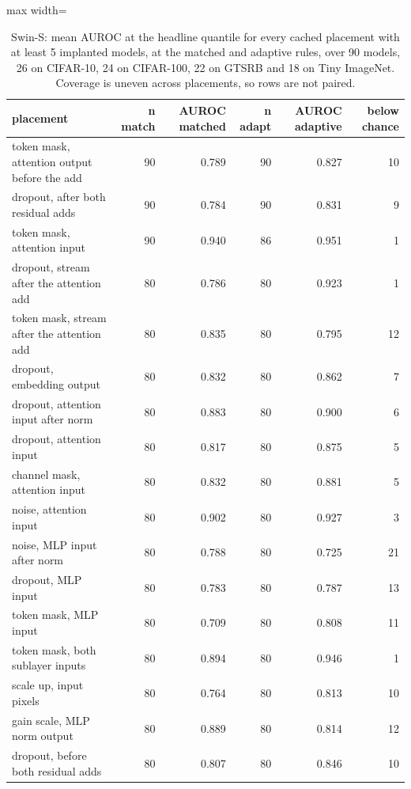 \begin{table}[htbp]
\centering
\small
\caption{Swin-S: mean AUROC at the headline quantile for every cached placement with at least 5 implanted models, at the matched and adaptive rules, over 90 models, 26 on CIFAR-10, 24 on CIFAR-100, 22 on GTSRB and 18 on Tiny ImageNet. Coverage is uneven across placements, so rows are not paired.}
\label{tab:swin-placements}
\begin{adjustbox}{max width=\linewidth}
\begin{tabular}{lrrrrr}
\toprule
placement & n match & AUROC matched & n adapt & AUROC adaptive & below chance \\
\midrule
token mask, attention output before the add & 90 & 0.789 & 90 & 0.827 & 10 \\
dropout, after both residual adds & 90 & 0.784 & 90 & 0.831 & 9 \\
token mask, attention input & 90 & 0.940 & 86 & 0.951 & 1 \\
dropout, stream after the attention add & 80 & 0.786 & 80 & 0.923 & 1 \\
token mask, stream after the attention add & 80 & 0.835 & 80 & 0.795 & 12 \\
dropout, embedding output & 80 & 0.832 & 80 & 0.862 & 7 \\
dropout, attention input after norm & 80 & 0.883 & 80 & 0.900 & 6 \\
dropout, attention input & 80 & 0.817 & 80 & 0.875 & 5 \\
channel mask, attention input & 80 & 0.832 & 80 & 0.881 & 5 \\
noise, attention input & 80 & 0.902 & 80 & 0.927 & 3 \\
noise, MLP input after norm & 80 & 0.788 & 80 & 0.725 & 21 \\
dropout, MLP input & 80 & 0.783 & 80 & 0.787 & 13 \\
token mask, MLP input & 80 & 0.709 & 80 & 0.808 & 11 \\
token mask, both sublayer inputs & 80 & 0.894 & 80 & 0.946 & 1 \\
scale up, input pixels & 80 & 0.764 & 80 & 0.813 & 10 \\
gain scale, MLP norm output & 80 & 0.889 & 80 & 0.814 & 12 \\
dropout, before both residual adds & 80 & 0.807 & 80 & 0.846 & 10 \\

\end{tabular}
\end{adjustbox}
\end{table}
